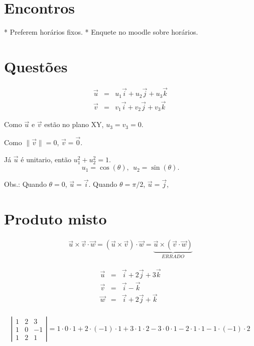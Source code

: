 \documentclass[a4paper,10pt]{article}
\title{}
\author{}
\begin{document}
\section{Encontros}

* Preferem horários fixos. 
* Enquete no moodle sobre horários.

\section{Questões}
\begin{eqnarray*}
 \vec{u} &=& u_1\vec{i} + u_2\vec{j} + u_3\vec{k}\\
 \vec{v} &=& v_1\vec{i} + v_2\vec{j} + v_3\vec{k}
\end{eqnarray*}

Como $\vec{u}$ e $\vec{v}$ estão no plano XY, $u_3=v_3=0$. 

Como $\|\vec{v}\|=0$, $\vec{v}=\vec{0}$.

Já $\vec{u}$ é unitario, então $u_1^2+u_2^2=1$.
$$u_1=\cos(\theta),~~u_2=\sin(\theta).$$

Obs.: Quando $\theta=0$, $\vec{u}=\vec{i}$.
Quando $\theta=\pi/2$, $\vec{u}=\vec{j}$,

\section{Produto misto}
\begin{eqnarray*}
 \vec{u}\times  \vec{v} \cdot \vec{w}=(\vec{u}\times  \vec{v}) \cdot \vec{w}=\underbrace{\vec{u}\times(  \vec{v} \cdot \vec{w})}_{ERRADO}
\end{eqnarray*}


\begin{eqnarray*}
\vec{u}&=&\vec{i}+2\vec{j}+3\vec{k}\\
\vec{v}&=&\vec{i}       -\vec{k}\\
\vec{w}&=&\vec{i}+2\vec{j}+\vec{k}\\
\end{eqnarray*}

\begin{eqnarray*}
\left|\begin{array}{ccc}
1&2&3\\       
1&0&-1\\
1&2&1
      \end{array}
\right| = 1\cdot 0 \cdot 1 + 2\cdot(-1)\cdot1 + 3\cdot 1\cdot 2 - 3\cdot 0\cdot 1 - 2\cdot 1\cdot 1 - 1 \cdot (-1) \cdot 2
\end{eqnarray*}
\end{document}
